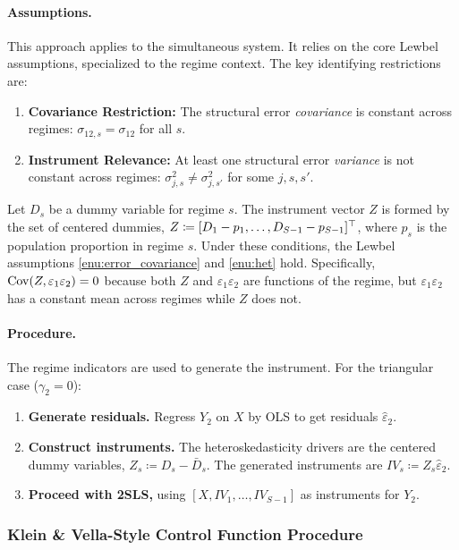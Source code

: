 \paragraph{Assumptions.}
This approach applies to the simultaneous system. It relies on the core Lewbel assumptions, specialized to the regime context. The key identifying restrictions are:
\begin{enumerate}
    \itemsep1pt
    \item \textbf{Covariance Restriction:} The structural error \emph{covariance} is constant across regimes: $\sigma_{12,s} = \sigma_{12}$ for all $s$.
    \item \textbf{Instrument Relevance:} At least one structural error \emph{variance} is not constant across regimes: $\sigma_{j,s}^2 \neq \sigma_{j,s'}^2$ for some $j, s, s'$.
\end{enumerate}
Let $D_s$ be a dummy variable for regime $s$. The instrument vector $Z$ is formed by the set of centered dummies, $Z \coloneqq [D_1 - p_1, \dots, D_{S-1}-p_{S-1}]^{\top}$, where $p_s$ is the population proportion in regime $s$. Under these conditions, the Lewbel assumptions \ref{enu:error_covariance} and \ref{enu:het} hold. Specifically, $\operatorname{Cov}(Z, \varepsilon_1\varepsilon_2) = 0$ because both $Z$ and $\varepsilon_1\varepsilon_2$ are functions of the regime, but $\varepsilon_1\varepsilon_2$ has a constant mean across regimes while $Z$ does not.

\paragraph{Procedure.}
The regime indicators are used to generate the instrument. For the triangular case ($\gamma_2 = 0$):
\begin{enumerate}
\itemsep2pt
\item \textbf{Generate residuals.} Regress $Y_{2}$ on $X$ by OLS to get residuals $\hat{\varepsilon}_{2}$.
\item \textbf{Construct instruments.} The heteroskedasticity drivers are the centered dummy variables, $Z_{s}\coloneqq D_{s}-\bar{D}_{s}$. The generated instruments are $IV_{s}\coloneqq Z_{s}\hat{\varepsilon}_{2}$.
\item \textbf{Proceed with 2SLS,} using $[X,IV_{1},\dots,IV_{S-1}]$ as instruments for $Y_{2}$.
\end{enumerate}

\subsubsection{Klein \& Vella-Style Control Function Procedure}
